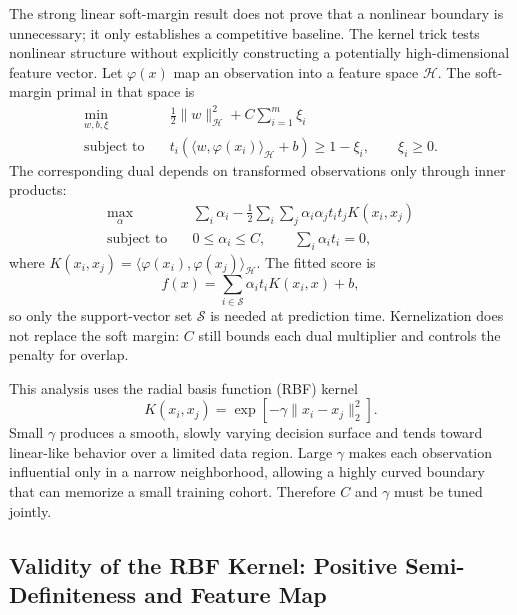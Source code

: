 \documentclass[11pt,a4paper]{article}
\numberwithin{equation}{section} %
\begin{document}
The strong linear soft-margin result does not prove that a nonlinear boundary
is unnecessary; it only establishes a competitive baseline. The kernel trick
tests nonlinear structure without explicitly constructing a potentially
high-dimensional feature vector. Let
$\varphi(x)$ map an observation into a feature space $\mathcal{H}$. The
soft-margin primal in that space is
\begin{equation}
\begin{aligned}
\min_{w,b,\xi}\quad
&\frac12\lVert w\rVert_{\mathcal H}^2+C\sum_{i=1}^{m}\xi_i\\
\text{subject to}\quad
&t_i(\langle w,\varphi(x_i)\rangle_{\mathcal H}+b)
\geq1-\xi_i,\qquad \xi_i\geq0.
\end{aligned}
\end{equation}
The corresponding dual depends on transformed observations only through inner
products:
\begin{equation}
\begin{aligned}
\max_{\alpha}\quad
&\sum_i\alpha_i-
\frac12\sum_i\sum_j\alpha_i\alpha_jt_it_jK(x_i,x_j)\\
\text{subject to}\quad
&0\leq\alpha_i\leq C,\qquad \sum_i\alpha_it_i=0,
\end{aligned}
\end{equation}
where
$K(x_i,x_j)=\langle\varphi(x_i),\varphi(x_j)\rangle_{\mathcal H}$.
The fitted score is
\begin{equation}
    f(x)=\sum_{i\in\mathcal S}\alpha_i t_iK(x_i,x)+b,
\end{equation}
so only the support-vector set $\mathcal S$ is needed at prediction time.
Kernelization does not replace the soft margin: $C$ still bounds each dual
multiplier and controls the penalty for overlap.

This analysis uses the radial basis function (RBF) kernel
\begin{equation}
    K(x_i,x_j)=\exp[-\gamma\lVert x_i-x_j\rVert_2^2].
\end{equation}
Small $\gamma$ produces a smooth, slowly varying decision surface and tends
toward linear-like behavior over a limited data region. Large $\gamma$ makes
each observation influential only in a narrow neighborhood, allowing a highly
curved boundary that can memorize a small training cohort. Therefore $C$ and
$\gamma$ must be tuned jointly.

\subsection{Validity of the RBF Kernel: Positive Semi-Definiteness and
Feature Map}
\label{sec:rbf-psd}
\end{document}
